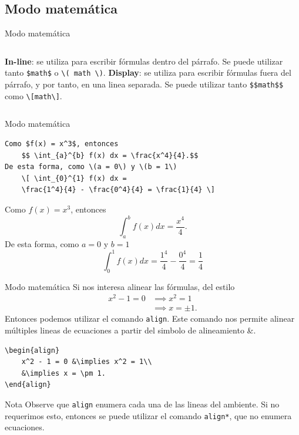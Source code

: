 \documentclass[../slides.tex]{subfiles}
\begin{document}
    \begin{frame}
        \tableofcontents[sections=\value{section}]
    \end{frame}

    \subsection{Modo matemática}

    \begin{frame}[fragile]{Modo matemática}
        \begin{columns}[t]
                \textbf{In-line}: se utiliza para escribir fórmulas dentro del párrafo. Se puede utilizar tanto \texttt{\$math\$} o \texttt{\textbackslash ( math \textbackslash )}.
                \textbf{Display}: se utiliza para escribir fórmulas fuera del párrafo, y por tanto, en una linea separada. Se puede utilizar tanto \texttt{\$\$math\$\$} como \texttt{\textbackslash[math\textbackslash]}.
        \end{columns}
        
    \end{frame}
        
    \begin{frame}[fragile]{Modo matemática}
        \begin{verbatim}
Como $f(x) = x^3$, entonces
    $$ \int_{a}^{b} f(x) dx = \frac{x^4}{4}.$$
De esta forma, como \(a = 0\) y \(b = 1\)
    \[ \int_{0}^{1} f(x) dx = 
    \frac{1^4}{4} - \frac{0^4}{4} = \frac{1}{4} \]
        \end{verbatim}
Como $f(x) = x^3$, entonces
    $$ \int_{a}^{b} f(x) dx = \frac{x^4}{4}.$$
De esta forma, como \(a = 0\) y \(b = 1\)
    \[ \int_{0}^{1} f(x) dx = 
    \frac{1^4}{4} - \frac{0^4}{4} = \frac{1}{4} \]
    \end{frame}
    
    \begin{frame}[fragile]{Modo matemática}
        Si nos interesa alinear las fórmulas, del estilo
            \begin{align}
            	x^2 - 1 = 0 &\implies x^2 = 1\\
            	&\implies x = \pm 1.
            \end{align}
        Entonces podemos utilizar el comando \texttt{align}. Este comando nos permite alinear múltiples lineas de ecuaciones a partir del simbolo de alineamiento \&.
            \begin{verbatim}
\begin{align}
    x^2 - 1 = 0 &\implies x^2 = 1\\
    &\implies x = \pm 1.
\end{align}
            \end{verbatim}
        \begin{block}{Nota}
        	Observe que \texttt{align} enumera cada una de las lineas del ambiente. Si no requerimos esto, entonces se puede utilizar el comando \texttt{align*}, que no enumera ecuaciones.
        \end{block}
    \end{frame}
\end{document}
